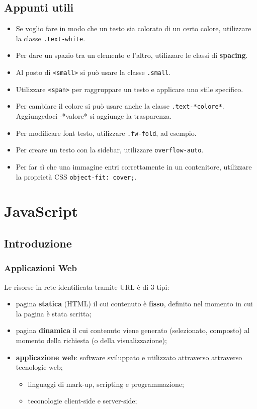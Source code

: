 \documentclass{article}
\begin{document}
\subsection{Appunti utili}
\begin{itemize}
    \item Se voglio fare in modo che un testo sia colorato di un certo colore, utilizzare la classe \texttt{.text-white}.
    \item Per dare un spazio tra un elemento e l'altro, utilizzare le classi di \textbf{spacing}.
    \item Al posto di \texttt{<small>} si può usare la classe \texttt{.small}.
    \item Utilizzare \texttt{<span>} per raggruppare un testo e applicare uno stile specifico.
    \item Per cambiare il colore si può usare anche la classe \texttt{.text-*colore*}. Aggiungedoci -*valore* si aggiunge la trasparenza.
    \item Per modificare font testo, utilizzare \texttt{.fw-fold}, ad esempio.
    \item Per creare un testo con la sidebar, utilizzare \texttt{overflow-auto}.
    \item Per far sì che una immagine entri correttamente in un contenitore, utilizzare la proprietà CSS \texttt{object-fit: cover;}.
\end{itemize}
\pagebreak
\section{JavaScript}
\subsection{Introduzione}
\subsubsection{Applicazioni Web}
Le risorse in rete identificata tramite URL è di 3 tipi:
\begin{itemize}
    \item pagina \textbf{statica} (HTML) il cui contenuto è \textbf{fisso}, definito nel momento in cui la pagina è stata scritta;
    \item pagina \textbf{dinamica} il cui contenuto viene generato (selezionato, composto) al momento della richiesta (o della visualizzazione);
    \item \textbf{applicazione web}: software sviluppato e utilizzato attraverso attraverso tecnologie web;
          \begin{itemize}
              \item linguaggi di mark-up, scripting e programmazione;
              \item teconologie client-side e server-side;
          \end{itemize}
\end{itemize}
\end{document}
